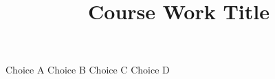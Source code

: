 \documentclass{iwork}
\title{Course Work Title}
\begin{document}
\begin{prob}
  \lipsum[1]
  \begin{tasks}
    \task \lipsum[2]
  \end{tasks}
  \begin{choices}
    \choice Choice A
    \choice Choice B
    \choice Choice C
    \choice Choice D
  \end{choices}
\end{prob}
\begin{sol}
  \lipsum[2]
\end{sol}
\end{document}
